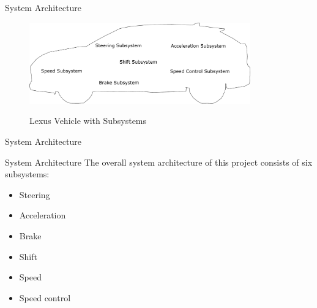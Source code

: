 \documentclass{beamer}
\begin{document}
\begin{frame}{System Architecture}{}
\begin{figure}
				\centering
				\includegraphics[height=3.5cm]{figs/inkscape/carSystemModelOutline}
				\label{fig:carSystemSubsystem}
				\caption{Lexus Vehicle with Subsystems}
        \end{figure}
\end{frame}

\begin{frame}{System Architecture}{}
	\begin{block}{System Architecture}
    The overall system architecture of this project consists of six subsystems: 
    \begin{itemize}
        \item Steering
        \item Acceleration
        \item Brake %
        \item Shift %
        \item Speed %
        \item Speed control %
      \end{itemize} 
  \end{block}
\end{frame}
\end{document}
